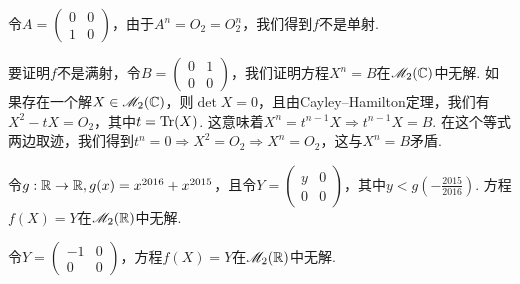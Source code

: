 \begin{solution}
  令$A=\begin{pmatrix}
    0 & 0 \\
    1 & 0
  \end{pmatrix}$，由于$A^n=O_2=O_2^n$，我们得到$f$不是单射.

  要证明$f$不是满射，令$B=\begin{pmatrix}
    0 & 1 \\
    0 & 0
  \end{pmatrix}$，我们证明方程$X^n=B$在$\mathscr M_2(\mathbb C)$中无解. 如果存在一个解$X\in\mathscr M_2(\mathbb C)$，则$\det X=0$，且由Cayley--Hamilton定理，我们有$X^2-tX=O_2$，其中$t=\operatorname{Tr}(X)$. 这意味着$X^n=t^{n-1}X\Rightarrow t^{n-1}X=B$. 在这个等式两边取迹，我们得到$t^n=0\Rightarrow X^2=O_2\Rightarrow X^n=O_2$，这与$X^n=B$矛盾.
\end{solution}

\begin{solution}
  \begin{inparaenum}[(a)]
    \item 令$g:\mathbb R\to\mathbb R,g(x)=x^{2016}+x^{2015}$，且令$Y=\begin{pmatrix}
          y & 0 \\
          0 & 0
        \end{pmatrix}$，其中$y<g\left(-\frac{2015}{2016}\right)$. 方程$f(X)=Y$在$\mathscr M_2(\mathbb R)$中无解.

    \item 令$Y=\begin{pmatrix}
      -1 & 0 \\
      0 & 0
    \end{pmatrix}$，方程$f(X)=Y$在$\mathscr M_2(\mathbb R)$中无解.
  \end{inparaenum}
\end{solution}


